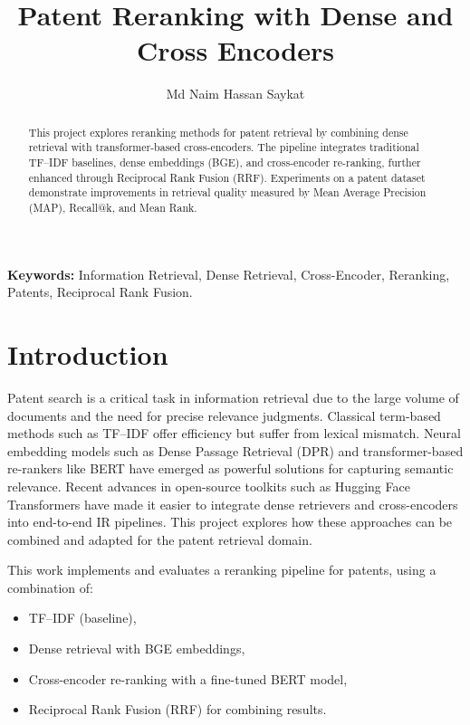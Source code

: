 \documentclass[11pt,a4paper]{article}
\title{\textbf{Patent Reranking with Dense and Cross Encoders}}
\author{Md Naim Hassan Saykat}
\date{}
\begin{document}
\maketitle

\begin{abstract}
This project explores reranking methods for patent retrieval by combining dense retrieval with transformer-based cross-encoders. The pipeline integrates traditional TF--IDF baselines, dense embeddings (BGE), and cross-encoder re-ranking, further enhanced through Reciprocal Rank Fusion (RRF). Experiments on a patent dataset demonstrate improvements in retrieval quality measured by Mean Average Precision (MAP), Recall@k, and Mean Rank.
\end{abstract}

\noindent \textbf{Keywords:} Information Retrieval, Dense Retrieval, Cross-Encoder, Reranking, Patents, Reciprocal Rank Fusion.

\section{Introduction}
Patent search is a critical task in information retrieval due to the large volume of documents and the need for precise relevance judgments. 
Classical term-based methods such as TF--IDF offer efficiency but suffer from lexical mismatch. 
Neural embedding models such as Dense Passage Retrieval (DPR) \cite{lin2020dpr} and transformer-based re-rankers like BERT \cite{nogueira2019passage} have emerged as powerful solutions for capturing semantic relevance. 
Recent advances in open-source toolkits such as Hugging Face Transformers \cite{wolf2020transformers} have made it easier to integrate dense retrievers and cross-encoders into end-to-end IR pipelines. 
This project explores how these approaches can be combined and adapted for the patent retrieval domain.

This work implements and evaluates a reranking pipeline for patents, using a combination of:
\begin{itemize}
    \item TF--IDF (baseline),
    \item Dense retrieval with BGE embeddings,
    \item Cross-encoder re-ranking with a fine-tuned BERT model,
    \item Reciprocal Rank Fusion (RRF) for combining results.
\end{itemize}

\end{document}
